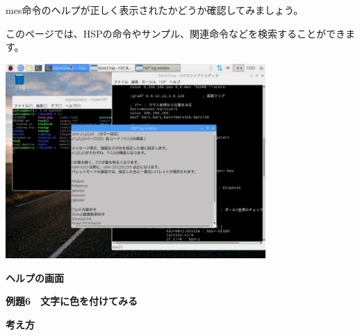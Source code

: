 \documentclass[a4paper,dvipdfmx]{jarticle}
\newcommand\textstyleqwerty[1]{#1}
\begin{document}
mes命令のヘルプが正しく表示されたかどうか確認してみましょう。

このページでは、HSPの命令やサンプル、関連命令などを検索することができます。


\bigskip


\bigskip



\begin{center}
\includegraphics[width=9.895cm,height=7.421cm]{text02-img/text02-img029.jpg}

\end{center}

\bigskip


\bigskip


\bigskip


\bigskip


\bigskip


\bigskip


\bigskip


\bigskip


\bigskip


\bigskip


\bigskip


\bigskip


\bigskip


\bigskip

\textstyleqwerty{\textbf{ヘルプの画面}}


\bigskip


\bigskip


\bigskip


\bigskip

\clearpage
\textstyleqwerty{\textbf{例題6　文字に色を付けてみる}}


\bigskip

{\bfseries
考え方}


\bigskip
\end{document}
